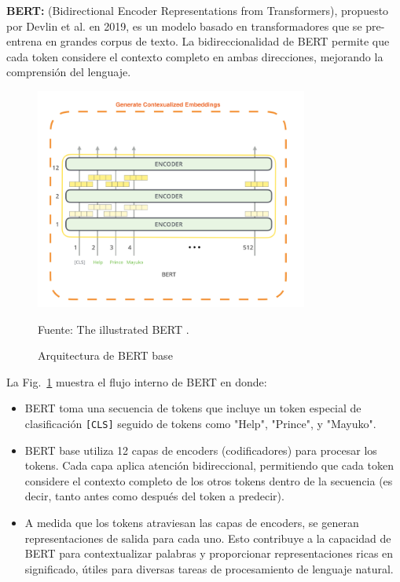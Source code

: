 \newpage
\textbf{BERT: } (Bidirectional Encoder Representations from Transformers), propuesto por Devlin et al. en 2019, es un modelo basado en transformadores que se pre-entrena en grandes corpus de texto. La bidireccionalidad de BERT permite que cada token considere el contexto completo en ambas direcciones, mejorando la comprensión del lenguaje.

\begin{figure}[H]
  \centering
  \includegraphics[width=0.8\textwidth]{Imagenes/arquitectura_bert.png}
  \caption{Arquitectura de BERT base}
   Fuente: The illustrated BERT \cite{alammar2018bert}.
  \label{fig:bert_architecture}
\end{figure}

La Fig.~\ref{fig:bert_architecture} muestra el flujo interno de BERT en donde:

\begin{itemize}

    \item BERT toma una secuencia de tokens que incluye un token especial de clasificación \texttt{[CLS]} seguido de tokens como "Help", "Prince", y "Mayuko".

    \item BERT base utiliza 12 capas de encoders (codificadores) para procesar los tokens. Cada capa aplica atención bidireccional, permitiendo que cada token considere el contexto completo de los otros tokens dentro de la secuencia (es decir, tanto antes como después del token a predecir).

    \item A medida que los tokens atraviesan las capas de encoders, se generan representaciones de salida para cada uno. Esto contribuye a la capacidad de BERT para contextualizar palabras y proporcionar representaciones ricas en significado, útiles para diversas tareas de procesamiento de lenguaje natural.

\end{itemize}

